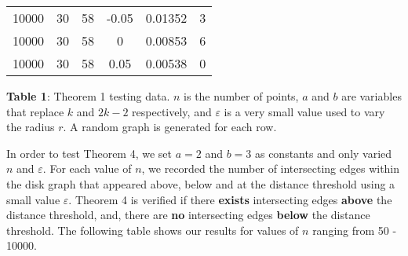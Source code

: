\documentclass{article}
\begin{document}
\begin{center}
\begin{longtable}{ | c | c | c | c | c | L | }
10000 & 30 & 58 & -0.05 & 0.01352 & 3 \\
10000 & 30 & 58 & 0 & 0.00853 & 6 \\
10000 & 30 & 58 & 0.05 & 0.00538 & 0 \\

\hline
\end{longtable}
\begin{small}
\textbf{Table 1}: Theorem 1 testing data. $n$ is the number of points, $a$ and $b$ are variables that replace $k$ and $2k-2$ respectively, and $\varepsilon$ is a very small value used to vary the radius $r$. A random graph is generated for each row.
\end{small}
\end{center}

\newpage
In order to test Theorem 4, we set $a=2$ and $b=3$ as constants and only varied $n$ and $\varepsilon$. For each value of $n$, we recorded the number of intersecting edges within the disk graph that appeared above, below and at the distance threshold using a small value $\varepsilon$. Theorem 4 is verified if there \textbf{exists} intersecting edges \textbf{above} the distance threshold, and, there are \textbf{no} intersecting edges \textbf{below} the distance threshold. The following table shows our results for values of $n$ ranging from 50 - 10000.
\end{document}

